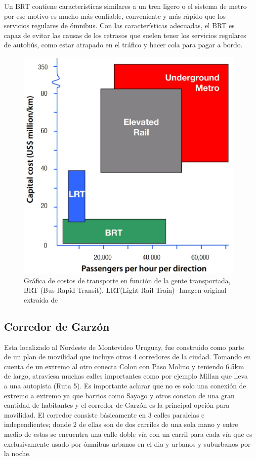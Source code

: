 Un BRT contiene características similares a un tren ligero o el sistema de metro por ese motivo es mucho más confiable, conveniente y más rápido que los servicios regulares de ómnibus. Con las características adecuadas, el BRT es capaz de evitar las causas de los retrasos que suelen tener los servicios regulares de autobús, como estar atrapado en el tráfico y hacer cola para pagar a bordo. 

\begin{figure}[h]
	\centering
	\includegraphics[width=0.7\linewidth]{Figures/costo_transporte}
	\caption{Gráfica de costos de transporte en función de la gente transportada, BRT (Bus Rapid Transit), LRT(Light Rail Train)- Imagen original extraída de \citep{ITDP}		
	}
	\label{fig:Grafica de costos de otros medios de transporte}
\end{figure}
	
\subsection{Corredor de Garzón}	

Esta localizado al Nordeste de Montevideo Uruguay, fue construido como parte de un plan de movilidad que incluye otros 4 corredores de la ciudad. Tomando en cuenta de un extremo al otro conecta Colon con Paso Molino y teniendo 6.5km de largo, atraviesa muchas calles importantes como por ejemplo Millan que lleva a una autopista (Ruta 5). Es importante aclarar que no es solo una conexión de extremo a extremo ya que barrios como Sayago y otros constan de una gran cantidad de habitantes y el corredor de Garzón es la principal opción para movilidad.
El corredor consiste básicamente en 3 calles paralelas e independientes; donde 2 de ellas son de dos carriles de una sola mano y entre medio de estas se encuentra una calle doble vía con un carril para cada vía que es exclusivamente usado por ómnibus urbanos en el dia y urbanos y suburbanos por la noche.

